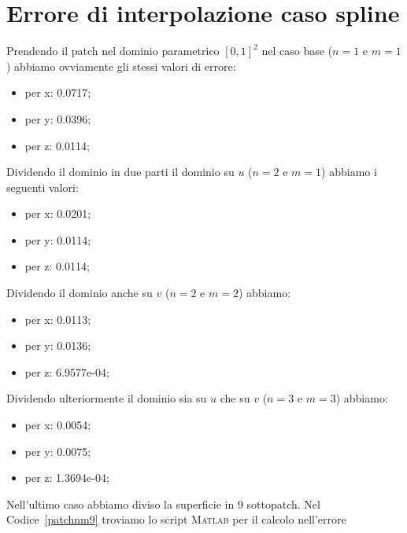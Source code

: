 \documentclass[12pt]{article}
\newcommand{\MATLAB}{\textsc{Matlab }}
\begin{document}
\section{Errore di interpolazione caso spline}\label{sec:erroriSpline}
Prendendo il patch nel dominio parametrico $[0, 1]^2$ nel caso base ($n = 1$ e $m = 1$)
abbiamo ovviamente gli stessi valori di errore:
\begin{itemize}[-]
	\item per x: 0.0717;
	\item per y: 0.0396;
	\item per z: 0.0114;
\end{itemize}
Dividendo il dominio in due parti il dominio su $u$ ($n = 2$ e $m = 1$) abbiamo i seguenti valori:
\begin{itemize}[-]
	\item per x: 0.0201;
	\item per y: 0.0114;
	\item per z: 0.0114;
\end{itemize}
Dividendo il dominio anche su $v$ ($n = 2$ e $m = 2$) abbiamo:
\begin{itemize}[-]
	\item per x: 0.0113;
	\item per y: 0.0136;
	\item per z: 6.9577e-04;
\end{itemize}

Dividendo ulteriormente il dominio sia su $u$ che su $v$ ($n = 3$ e $m = 3$) abbiamo:
\begin{itemize}[-]
	\item per x: 0.0054;
	\item per y: 0.0075;
	\item per z: 1.3694e-04;
\end{itemize}
Nell'ultimo caso abbiamo diviso la superficie in 9 sottopatch. 
Nel Codice~\ref{patchnm9} troviamo lo script \MATLAB per il calcolo nell'errore
\end{document}
